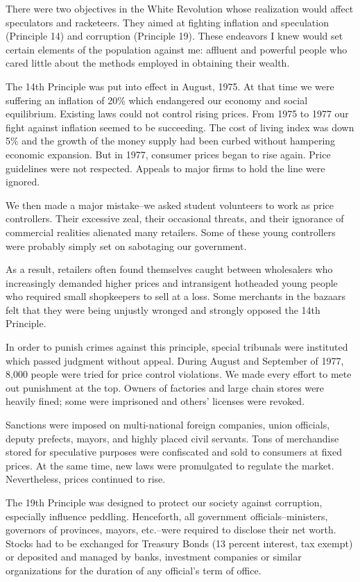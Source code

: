 There were two objectives in the White Revolution whose realization would affect speculators and racketeers. They aimed at fighting inflation and speculation (Principle 14) and corruption (Principle 19). These endeavors I knew would set certain elements of the population against me: affluent and powerful people who cared little about the methods employed in obtaining their wealth. 

The 14th Principle was put into effect in August, 1975. At that time we were suffering an inflation of 20\% which endangered our economy and social equilibrium. Existing laws could not control rising prices. From 1975 to 1977 our fight against inflation seemed to be succeeding. The cost of living index was down 5\% and the growth of the money supply had been curbed without hampering economic expansion. But in 1977, consumer prices began to rise again. Price guidelines were not respected. Appeals to major firms to hold the line were ignored. 

We then made a major mistake--we asked student volunteers to work as price controllers. Their excessive zeal, their occasional threats, and their ignorance of commercial realities alienated many retailers. Some of these young controllers were probably simply set on sabotaging our government. 

As a result, retailers often found themselves caught between wholesalers who increasingly demanded higher prices and intransigent hotheaded young people who required small shopkeepers to sell at a loss. Some merchants in the bazaars felt that they were being unjustly wronged and strongly opposed the 14th Principle. 

In order to punish crimes against this principle, special tribunals were instituted which passed judgment without appeal. During August and September of 1977, 8,000 people were tried for price control violations. We made every effort to mete out punishment at the top. Owners of factories and large chain stores were heavily fined; some were imprisoned and others’ licenses were revoked. 

Sanctions were imposed on multi-national foreign companies, union officials, deputy prefects, mayors, and highly placed civil servants. Tons of merchandise stored for speculative purposes were confiscated and sold to consumers at fixed prices. At the same time, new laws were promulgated to regulate the market. Nevertheless, prices continued to rise. 

The 19th Principle was designed to protect our society against corruption, especially influence peddling. Henceforth, all government officials--ministers, governors of provinces, mayors, etc.--were required to disclose their net worth. Stocks had to be exchanged for Treasury Bonds (13 percent interest, tax exempt) or deposited and managed by banks, investment companies or similar organizations for the duration of any official's term of office. 


